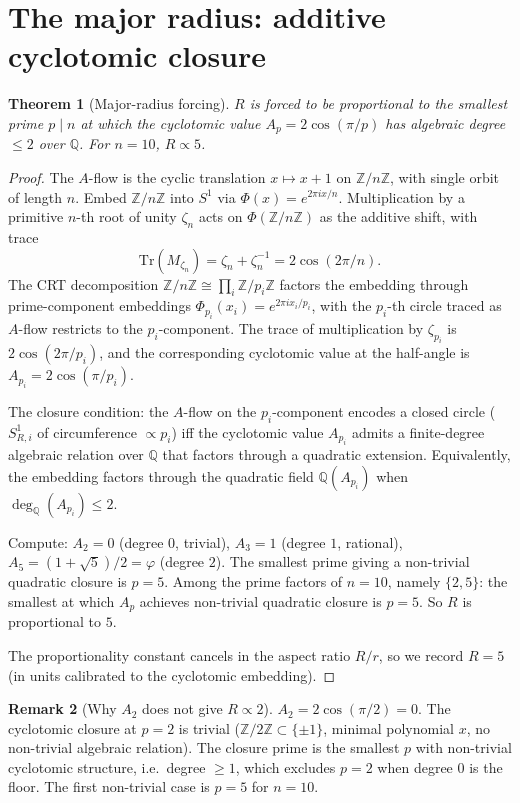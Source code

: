 \documentclass[11pt,reqno]{amsart}
\theoremstyle{plain}
\newtheorem{theorem}{Theorem}
\theoremstyle{definition}
\newtheorem{remark}[theorem]{Remark}
\newcommand{\Z}{\mathbb{Z}}
\newcommand{\Q}{\mathbb{Q}}
\newcommand{\Zn}{\Z/n\Z}
\begin{document}
\section{The major radius: additive cyclotomic closure} \label{sec:R-major}

\begin{theorem}[Major-radius forcing] \label{thm:R-forced}
$R$ is forced to be proportional to the smallest prime $p \mid n$ at which the cyclotomic value $A_p = 2\cos(\pi/p)$ has algebraic degree $\leq 2$ over $\Q$. For $n = 10$, $R \propto 5$.
\end{theorem}

\begin{proof}
The $A$-flow is the cyclic translation $x \mapsto x+1$ on $\Zn$, with single orbit of length $n$. Embed $\Zn$ into $S^1$ via $\Phi(x) = e^{2 \pi i x / n}$. Multiplication by a primitive $n$-th root of unity $\zeta_n$ acts on $\Phi(\Zn)$ as the additive shift, with trace
\[
\mathrm{Tr}(M_{\zeta_n}) = \zeta_n + \zeta_n^{-1} = 2 \cos(2\pi/n).
\]
The CRT decomposition $\Zn \cong \prod_i \Z/p_i\Z$ factors the embedding through prime-component embeddings $\Phi_{p_i}(x_i) = e^{2 \pi i x_i / p_i}$, with the $p_i$-th circle traced as $A$-flow restricts to the $p_i$-component. The trace of multiplication by $\zeta_{p_i}$ is $2 \cos(2 \pi / p_i)$, and the corresponding cyclotomic value at the half-angle is $A_{p_i} = 2 \cos(\pi/p_i)$.

The closure condition: the $A$-flow on the $p_i$-component encodes a closed circle ($S^1_{R,i}$ of circumference $\propto p_i$) iff the cyclotomic value $A_{p_i}$ admits a finite-degree algebraic relation over $\Q$ that factors through a quadratic extension. Equivalently, the embedding factors through the quadratic field $\Q(A_{p_i})$ when $\deg_{\Q}(A_{p_i}) \leq 2$.

Compute: $A_2 = 0$ (degree $0$, trivial), $A_3 = 1$ (degree $1$, rational), $A_5 = (1+\sqrt 5)/2 = \varphi$ (degree $2$). The smallest prime giving a non-trivial quadratic closure is $p = 5$. Among the prime factors of $n = 10$, namely $\{2, 5\}$: the smallest at which $A_p$ achieves non-trivial quadratic closure is $p = 5$. So $R$ is proportional to $5$.

The proportionality constant cancels in the aspect ratio $R/r$, so we record $R = 5$ (in units calibrated to the cyclotomic embedding).
\end{proof}

\begin{remark}[Why $A_2$ does not give $R \propto 2$]
$A_2 = 2 \cos(\pi/2) = 0$. The cyclotomic closure at $p = 2$ is trivial ($\Z/2\Z \subset \{\pm 1\}$, minimal polynomial $x$, no non-trivial algebraic relation). The closure prime is the smallest $p$ with non-trivial cyclotomic structure, i.e.\ degree $\geq 1$, which excludes $p = 2$ when degree $0$ is the floor. The first non-trivial case is $p = 5$ for $n = 10$.
\end{remark}
\end{document}
